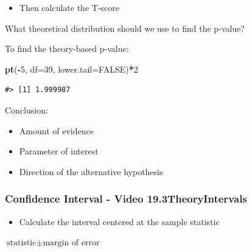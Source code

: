 \documentclass[
]{report}
\newenvironment{Shaded}{\begin{snugshade}}{\end{snugshade}}
\newcommand{\AttributeTok}[1]{\textcolor[rgb]{0.13,0.29,0.53}{#1}}
\newcommand{\ConstantTok}[1]{\textcolor[rgb]{0.56,0.35,0.01}{#1}}
\newcommand{\DecValTok}[1]{\textcolor[rgb]{0.00,0.00,0.81}{#1}}
\newcommand{\FunctionTok}[1]{\textcolor[rgb]{0.13,0.29,0.53}{\textbf{#1}}}
\newcommand{\NormalTok}[1]{#1}
\newcommand{\SpecialCharTok}[1]{\textcolor[rgb]{0.81,0.36,0.00}{\textbf{#1}}}
\providecommand{\tightlist}{%
  \setlength{\itemsep}{0pt}\setlength{\parskip}{0pt}}
\newcommand{\rgi}{\hspace{24pt}}  %
\begin{document}
\vspace{0.6in}

\begin{itemize}
\tightlist
\item
  Then calculate the T-score
\end{itemize}

\vspace{1in}

What theoretical distribution should we use to find the p-value?

\vspace{0.3in}

To find the theory-based p-value:

\begin{Shaded}
\begin{Highlighting}[]
\FunctionTok{pt}\NormalTok{(}\SpecialCharTok{{-}}\DecValTok{5}\NormalTok{, }\AttributeTok{df=}\DecValTok{39}\NormalTok{, }\AttributeTok{lower.tail=}\ConstantTok{FALSE}\NormalTok{)}\SpecialCharTok{*}\DecValTok{2}
\end{Highlighting}
\end{Shaded}

\begin{verbatim}
#> [1] 1.999987
\end{verbatim}

Conclusion:

\begin{itemize}
\item
  Amount of evidence
\item
  Parameter of interest
\item
  Direction of the alternative hypothesis
\end{itemize}

\vspace{0.6in}

\subsubsection*{Confidence Interval - Video 19.3TheoryIntervals}\label{confidence-interval---video-19.3theoryintervals}

\begin{itemize}
\tightlist
\item
  Calculate the interval centered at the sample statistic
\end{itemize}

\rgi \(\text{statistic} \pm \text{margin of error}\)
\end{document}
